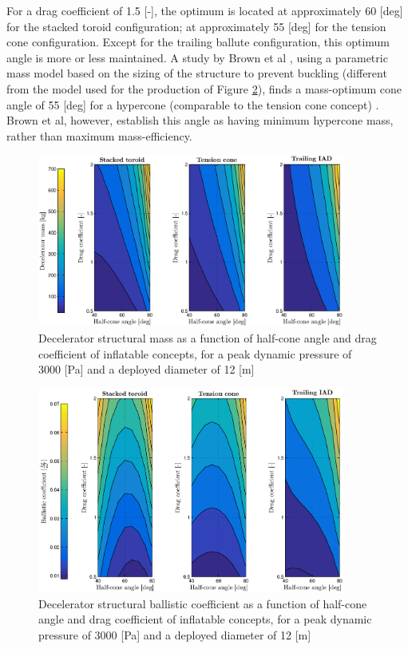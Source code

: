 For a drag coefficient of 1.5 [-], the optimum is located at approximately 60 [deg] for the stacked toroid configuration; at approximately 55 [deg] for the tension cone configuration. Except for the trailing ballute configuration, this optimum angle is more or less maintained. A study by Brown et al \cite{Brown2003}, using a parametric mass model based on the sizing of the structure to prevent buckling (different from the model used for the production of Figure \ref{fig:bc_theta_cd}), finds a mass-optimum cone angle of 55 [deg] for a hypercone (comparable to the tension cone concept) \cite[p.6]{Brown2003}. Brown et al, however, establish this angle as having minimum hypercone mass, rather than maximum mass-efficiency. 
\begin{figure}[H]
\centering
\includegraphics[width = 0.9\textwidth]{Figure/mass_theta_cd.eps}
\caption{Decelerator structural mass as a function of half-cone angle and drag coefficient of inflatable concepts, for a peak dynamic pressure of 3000 [Pa] and a deployed diameter of 12 [m]}
\label{fig:mass_theta_cd}
\end{figure}

\begin{figure}[H]
\centering
\includegraphics[width = 0.9\textwidth]{Figure/bc_theta_cd.eps}
\caption{Decelerator structural ballistic coefficient as a function of half-cone angle and drag coefficient of inflatable concepts, for a peak dynamic pressure of 3000 [Pa] and a deployed diameter of 12 [m]}
\label{fig:bc_theta_cd}
\end{figure}

